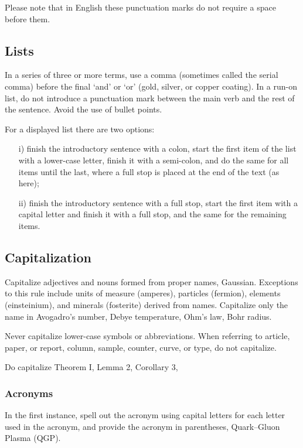\documentclass{cernyrep}
\begin{document}
Please note that in English these punctuation marks do not require a
space before them.

\subsection{Lists}

In a series of three or more terms, use a comma (sometimes called the
serial comma) before the final `and' or `or' (\eg gold, silver, or
copper coating). In a run-on list, do not introduce a punctuation mark
between the main verb and the rest of the sentence.  Avoid the use of
bullet points.

For a displayed list there are two options:

\begin{itemize}
\item[i)]  finish the introductory sentence with a colon, start the
           first item of the list with a lower-case letter, finish it
           with a semi-colon, and do the same for all items until the
           last, where a full stop is placed at the end of the text
           (as here);
\item[ii)] finish the introductory sentence with a full stop, start
           the first item with a capital letter and finish it with a
           full stop, and the same for the remaining items.
\end{itemize}

\subsection{Capitalization}

Capitalize adjectives and nouns formed from proper names,
\eg Gaussian.  Exceptions to this rule include units of measure
(amperes), particles (fermion), elements (einsteinium), and minerals
(fosterite) derived from names.  Capitalize only the name in
Avogadro's number, Debye temperature, Ohm's law, Bohr radius.

Never capitalize lower-case symbols or abbreviations. When referring
to article, paper, or report, column, sample, counter, curve, or type,
do not capitalize.

Do capitalize Theorem I, Lemma 2, Corollary 3, \etc

\subsubsection{Acronyms}

In the first instance, spell out the acronym using capital letters for
each letter used in the acronym, and provide the acronym in
parentheses, \eg Quark--Gluon Plasma (QGP).
\end{document}
